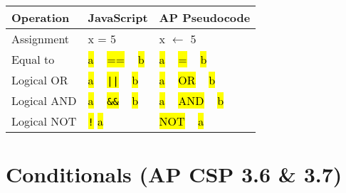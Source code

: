\documentclass{article}
\newcommand{\hlc}[2][yellow]{ {\sethlcolor{#1} \hl{#2}} }
\begin{document}
\begin{tabular}{l|l|l}
\toprule
\textbf{Operation} & \textbf{JavaScript} & \textbf{AP Pseudocode} \\
\midrule
Assignment & x = 5 & x $\leftarrow$ 5 \\
Equal to & \hlc[white]{a} \ \hlc[yellow!40]{==} \ \hlc[white]{b} & \hlc[white]{a} \ \hlc[yellow!40]{=} \ \hlc[white]{b} \\
Logical OR & \hlc[white]{a} \ \hlc[red!20]{\texttt{||}} \ \hlc[white]{b} & \hlc[white]{a} \ \hlc[red!20]{OR} \ \hlc[white]{b} \\
Logical AND & \hlc[white]{a} \ \hlc[red!20]{\texttt{\&\&}} \ \hlc[white]{b} & \hlc[white]{a} \ \hlc[red!20]{AND} \ \hlc[white]{b} \\
Logical NOT & \hlc[red!20]{\texttt{!}}\hlc[white]{a} & \hlc[red!20]{NOT} \ \hlc[white]{a} \\
\bottomrule
\end{tabular}




\section*{Conditionals (AP CSP 3.6 \& 3.7)}
\end{document}
